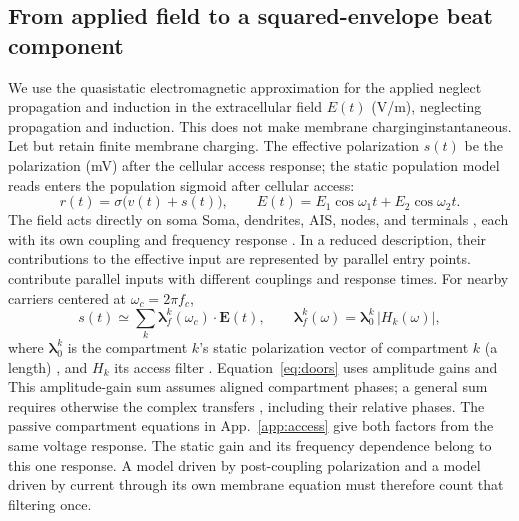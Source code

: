 \documentclass[11pt,a4paper]{article}
\newcommand{\Sig}{\sigma}
\providecommand{\DIFaddtex}[1]{{\protect\color{blue} \sf #1}} %
\providecommand{\DIFdeltex}[1]{{\protect\color{red} \scriptsize #1}} %
\providecommand{\DIFaddbegin}{} %
\providecommand{\DIFaddend}{} %
\providecommand{\DIFdelbegin}{} %
\providecommand{\DIFdelend}{} %
\providecommand{\DIFadd}[1]{\texorpdfstring{\DIFaddtex{#1}}{#1}} %
\providecommand{\DIFdel}[1]{\texorpdfstring{\DIFdeltex{#1}}{}} %
\begin{document}
\subsection{From applied field to a squared-envelope beat component}\label{sec:coupling}
We \DIFdelbegin \DIFdel{use the quasistatic electromagnetic approximation for the applied }\DIFdelend \DIFaddbegin \DIFadd{neglect propagation and induction in the extracellular }\DIFaddend field $E(t)$ (V/m),
\DIFdelbegin \DIFdel{neglecting propagation and induction. This does not make membrane charginginstantaneous. Let }\DIFdelend \DIFaddbegin \DIFadd{but retain finite membrane charging. The effective polarization }\DIFaddend $s(t)$ \DIFdelbegin \DIFdel{be the polarization }\DIFdelend (mV)
\DIFdelbegin \DIFdel{after the cellular access response;
the static population model reads
}\DIFdelend \DIFaddbegin \DIFadd{enters the population sigmoid after cellular access:
}\DIFaddend \begin{equation}
r(t)=\Sig\!\big(v(t)+s(t)\big),\qquad
E(t)=E_1\cos\omega_1 t+E_2\cos\omega_2 t .
\label{eq:coupling}
\end{equation}
\DIFdelbegin \DIFdel{The field acts directly on soma}\DIFdelend \DIFaddbegin \DIFadd{Soma}\DIFaddend , dendrites, AIS, nodes, and terminals \DIFdelbegin \DIFdel{,
each with
its own coupling and frequency response . In a reduced description, their
contributions to the effective input are represented by parallel entry points.
}\DIFdelend \DIFaddbegin \DIFadd{contribute parallel inputs with
different couplings and response times. }\DIFaddend For nearby carriers centered at
$\omega_c=2\pi f_c$,
\begin{equation}
s(t)\simeq\sum_k \boldsymbol\lambda^k_f(\omega_c)\!\cdot\!\mathbf E(t),\qquad
\boldsymbol\lambda^k_f(\omega)=\boldsymbol\lambda^k_0\,\lvert H_k(\omega)\rvert,
\label{eq:doors}
\end{equation}
where $\boldsymbol\lambda^k_0$ is \DIFdelbegin \DIFdel{the }\DIFdelend \DIFaddbegin \DIFadd{compartment $k$'s }\DIFaddend static polarization vector
\DIFdelbegin \DIFdel{of compartment $k$ }\DIFdelend (a length) \DIFdelbegin \DIFdel{,
}\DIFdelend and $H_k$ its access filter \cite{ruffini2025rosetta,galangadea2023}.
\DIFdelbegin \DIFdel{Equation~\eqref{eq:doors} uses amplitude
gains and }\DIFdelend \DIFaddbegin \DIFadd{This amplitude-gain sum }\DIFaddend assumes aligned compartment phases; \DIFdelbegin \DIFdel{a general sum requires }\DIFdelend \DIFaddbegin \DIFadd{otherwise }\DIFaddend the
complex transfers \DIFdelbegin \DIFdel{, including their relative phases. The passive compartment equations in
App.~\ref{app:access} give both factors from the same voltage response.
The static gain and its frequency dependence belong to this
one response. A model driven by post-coupling polarization and a model driven by
current through its own membrane equation must therefore count that filtering once. }%
\end{document}
